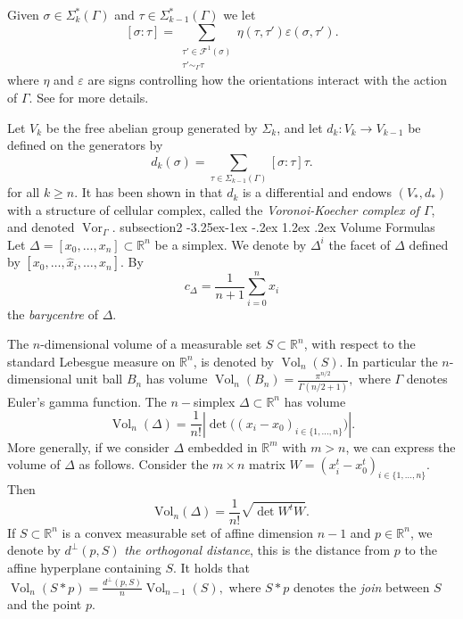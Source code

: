 \documentclass[11pt,a4paper,twoside]{amsart}
\makeatletter
\renewcommand{\subsection}{\@startsection
  {subsection}{2}{\z@}%
  {-3.25ex\@plus -1ex \@minus -.2ex}%
  {1.2ex \@plus .2ex}%
  {\normalfont\bfseries}}
\theoremstyle{plain}
\theoremstyle{definition}
\newtheorem{definition}[theorem]{\bfseries Definition}
\newcommand{\facets}[0]{\mathcal{F}^1(\sigma)}
\newcommand{\vol}[0]{\mathrm{Vol}}
\renewcommand{\ge}{\geqslant}
\makeatother
\begin{document}
Given $\sigma\in\Sigma_{k}^*(\Gamma)$ and $\tau\in\Sigma_{k-1}^*(\Gamma)$ we
let 
$$[\sigma:\tau] = \sum_{\substack{\tau'\in\facets\\
                \tau'\sim_\Gamma\tau}} \eta(\tau,\tau')\varepsilon(\sigma,\tau').$$
where $\eta$ and $\varepsilon$ are signs controlling how the orientations interact with the action of $\Gamma$. See \cite[Section 3.3]{philippe_advances} for more details.

Let $V_k$ be the free abelian group generated by $\Sigma_k$, and let
$d_k : V_k \to V_{k-1}$ be defined on the generators by 
\begin{equation*}
\label{differential}
    d_k(\sigma) = \sum_{\tau\in\Sigma_{k-1}(\Gamma)} [\sigma:\tau]\tau.
\end{equation*}
for all $k\ge n$. It has been shown in \cite{2002, philippe_advances} that $d_k$ is a differential and endows
$(V_*, d_*)$ with a structure of cellular complex, called 
the \textit{Voronoi-Koecher complex of $\Gamma$}, and denoted  $\operatorname{Vor}_\Gamma$.
\subsection{Volume Formulas}
Let $\Delta = [x_0,\dots,x_n]\subset \mathbb{R}^n$ be a simplex. We denote by $\Delta^i$ the facet of $\Delta$ defined by $[x_0,\dots, \hat x_i,\dots,x_n]$. By $$c_{\Delta} = \frac{1}{n+1}\sum_{i = 0}^n x_i$$ the \textit{barycentre} of $\Delta$.

The $n$-dimensional volume of a measurable set $S \subset \mathbb{R}^{n}$, with respect to the standard Lebesgue measure on $\mathbb{R}^{n}$, is denoted by $\operatorname{Vol}_n(S)$.
In particular the $n$-dimensional unit
ball $B_n$ has volume
$
    \operatorname{Vol}_n(B_n)
    =
    \frac{\pi^{n/2}}{\Gamma(n/2+1)},
$
where $\Gamma$ denotes Euler's gamma function. The $n-$simplex $\Delta\subset\mathbb{R}^n$ has volume
$$
    \operatorname{Vol}_n(\Delta)
    =
    \frac{1}{n!}
    \left| \det\bigl((x_i-x_0)_{i \in \{1,\dots,n\}}\bigr) \right|.
$$
More generally, if we consider $\Delta$ embedded in $\mathbb{R}^m$ with $m>n$, we can express the volume of $\Delta$ as follows. Consider the $m\times n$ matrix $W = (x_i^t-x_0^t)_{i\in\{1,\dots,n\}}$. Then
$$\vol_{n}(\Delta) = \frac{1}{n!}\sqrt{\det W^tW}.$$
If $S \subset \mathbb{R}^n$ is a convex measurable set of affine dimension $n-1$ and $p \in \mathbb{R}^n$, we denote by $d^\perp(p,S)$ \textit{the orthogonal distance}, this is the distance from $p$ to the affine hyperplane containing $S$. It holds that
$
    \operatorname{Vol}_n(S * p)
    =
    \frac{d^{\perp}(p, S)}{n} \operatorname{Vol}_{n-1}(S),
$
where $S*p$ denotes the \textit{join} between $S$ and the point $p$.
\end{document}
